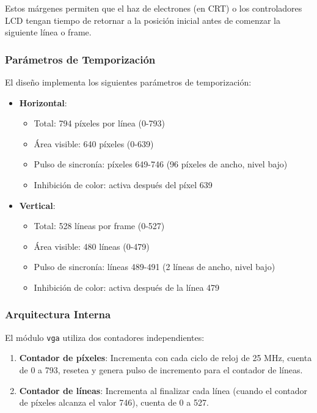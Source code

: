 \documentclass[a4paper, 12pt]{report}
\begin{document}
Estos márgenes permiten que el haz de electrones (en CRT) o los controladores LCD tengan tiempo de retornar a la posición inicial antes de comenzar la siguiente línea o frame.

\subsubsection{Parámetros de Temporización}

El diseño implementa los siguientes parámetros de temporización:

\begin{itemize}
    \item \textbf{Horizontal}:
    \begin{itemize}
        \item Total: 794 píxeles por línea (0-793)
        \item Área visible: 640 píxeles (0-639)
        \item Pulso de sincronía: píxeles 649-746 (96 píxeles de ancho, nivel bajo)
        \item Inhibición de color: activa después del píxel 639
    \end{itemize}

    \item \textbf{Vertical}:
    \begin{itemize}
        \item Total: 528 líneas por frame (0-527)
        \item Área visible: 480 líneas (0-479)
        \item Pulso de sincronía: líneas 489-491 (2 líneas de ancho, nivel bajo)
        \item Inhibición de color: activa después de la línea 479
    \end{itemize}
\end{itemize}

\subsubsection{Arquitectura Interna}

El módulo \texttt{vga} utiliza dos contadores independientes:

\begin{enumerate}
    \item \textbf{Contador de píxeles}: Incrementa con cada ciclo de reloj de 25 MHz, cuenta de 0 a 793, resetea y genera pulso de incremento para el contador de líneas.

    \item \textbf{Contador de líneas}: Incrementa al finalizar cada línea (cuando el contador de píxeles alcanza el valor 746), cuenta de 0 a 527.
\end{enumerate}
\end{document}
